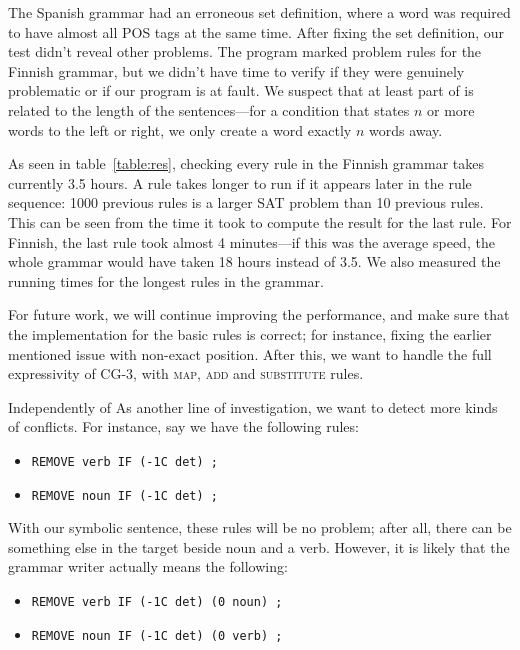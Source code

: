 The Spanish grammar had an erroneous set definition, where a word was required to have almost all POS tags at the same time. After fixing the set definition, our test didn't reveal other problems.
The program marked  problem rules for the Finnish grammar, but we didn't have time to verify if they were genuinely problematic or if our program is at fault.
We suspect that at least part of is related to the length of the sentences---for a condition that states $n$ or more words to the left or right, we only create a word exactly $n$ words away.

As seen in table~\ref{table:res}, checking every rule in the Finnish grammar takes currently 3.5 hours.
A rule takes longer to run if it appears later in the rule sequence: 1000 previous rules is a larger SAT problem than 10 previous rules.
This can be seen from the time it took to compute the result for the last rule. For Finnish, the last rule took almost 4 minutes---if this was the average speed, the whole grammar would have taken 18 hours instead of 3.5.
We also measured the running times for the longest rules in the grammar.


For future work, we will continue improving the performance, and make sure that the implementation for the basic rules is correct; for instance, fixing the earlier mentioned issue with non-exact position.
After this, we want to handle the full expressivity of CG-3, with \textsc{map}, \textsc{add} and \textsc{substitute} rules.

Independently of 
As another line of investigation, we want to detect more kinds of conflicts.
For instance, say we have the following rules:

\begin{itemize}
\item[] \texttt{REMOVE verb IF (-1C det) ;}
\item[] \texttt{REMOVE noun IF (-1C det) ;}
\end{itemize}

With our symbolic sentence, these rules will be no problem; after all, there can be something else in the target beside noun and a verb.
However, it is likely that the grammar writer actually means the following:

\begin{itemize}
\item[] \texttt{REMOVE verb IF (-1C det) (0 noun) ;}
\item[] \texttt{REMOVE noun IF (-1C det) (0 verb) ;}
\end{itemize}

